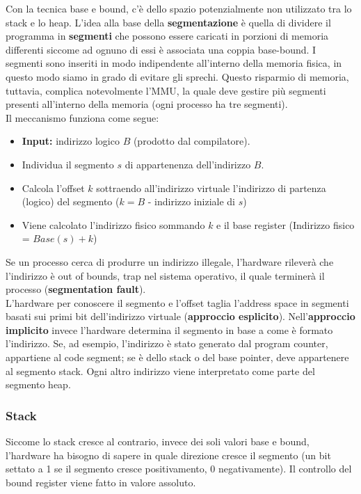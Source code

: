 \documentclass[12pt, letterpaper]{article}
\begin{document}
				Con la tecnica base e bound, c'è dello spazio potenzialmente non utilizzato tra lo stack e lo heap. L'idea alla base della \textbf{segmentazione} è quella di dividere il programma in \textbf{segmenti} che possono essere caricati in porzioni di memoria differenti siccome ad ognuno di essi è associata una coppia base-bound. I segmenti sono inseriti in modo indipendente all'interno della memoria fisica, in questo modo siamo in grado di evitare gli sprechi. Questo risparmio di memoria, tuttavia, complica notevolmente l'MMU, la quale deve gestire più segmenti presenti all'interno della memoria (ogni processo ha tre segmenti).\\
				Il meccanismo funziona come segue:
				\begin{itemize}
					\item \textbf{Input:} indirizzo logico $B$ (prodotto dal compilatore).
					\item Individua il segmento $s$ di appartenenza dell'indirizzo $B$.
					\item Calcola l'offset $k$ sottraendo all'indirizzo virtuale l'indirizzo di partenza (logico) del segmento ($k = B$ - indirizzo iniziale di $s$)
					\item Viene calcolato l'indirizzo fisico sommando $k$ e il base register (Indirizzo fisico = $Base(s)+k$)
				\end{itemize}
				Se un processo cerca di produrre un indirizzo illegale, l'hardware rileverà che l'indirizzo è out of bounds, trap nel sistema operativo, il quale terminerà il processo (\textbf{segmentation fault}).\\
				L'hardware per conoscere il segmento e l'offset taglia l'address space in segmenti basati sui primi bit dell'indirizzo virtuale (\textbf{approccio esplicito}). Nell'\textbf{approccio implicito} invece l'hardware determina il segmento in base a come è formato l'indirizzo. Se, ad esempio, l'indirizzo è stato generato dal program counter, appartiene al code segment; se è dello stack o del base pointer, deve appartenere al segmento stack. Ogni altro indirizzo viene interpretato come parte del segmento heap.
			
			\subsubsection{Stack}
				Siccome lo stack cresce al contrario, invece dei soli valori base e bound, l'hardware ha bisogno di sapere in quale direzione cresce il segmento (un bit settato a 1 se il segmento cresce positivamento, 0 negativamente). Il controllo del bound register viene fatto in valore assoluto.
				
\end{document}

